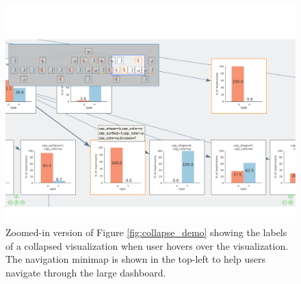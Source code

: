 \begin{figure}[ht!]
\centering
\includegraphics[width=\linewidth]{figures/minimap_zoom.pdf}
\caption{Zoomed-in version of Figure \ref{fig:collapse_demo} showing the labels of a collapsed visualization when user hovers over the visualization. The navigation minimap is shown in the top-left to help users navigate through the large dashboard.}
\label{fig:hover_minimap}
\end{figure}
